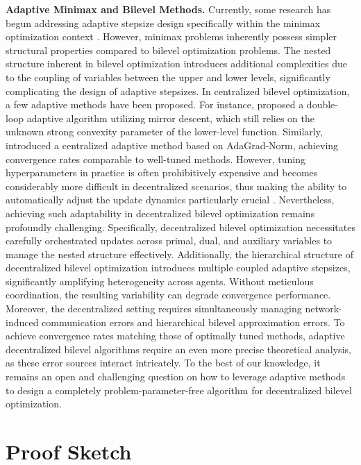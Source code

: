 \documentclass{article}
\theoremstyle{plain}
\theoremstyle{definition}
\theoremstyle{remark}
\begin{document}
\textbf{Adaptive Minimax and Bilevel Methods.}
Currently, some research has begun addressing adaptive stepsize design specifically within the minimax optimization context \citep{li2022tiada, huang2024adaptive, huang2024achieving}. However, minimax problems inherently possess simpler structural properties compared to bilevel optimization problems. The nested structure inherent in bilevel optimization introduces additional complexities due to the coupling of variables between the upper and lower levels, significantly complicating the design of adaptive stepsizes.
In centralized bilevel optimization, a few adaptive methods have been proposed. For instance, \citet{antonakopoulos2024adaptive} proposed a double-loop adaptive algorithm utilizing mirror descent, which still relies on the unknown strong convexity parameter of the lower-level function.
Similarly, \citet{yang2024tuning} introduced a centralized adaptive method based on AdaGrad-Norm, achieving convergence rates comparable to well-tuned methods. However, tuning hyperparameters in practice is often prohibitively expensive and becomes considerably more difficult in decentralized scenarios, thus making the ability to automatically adjust the update dynamics particularly crucial \citep{li2024problem}. Nevertheless, achieving such adaptability in decentralized bilevel optimization remains profoundly challenging. Specifically, decentralized bilevel optimization necessitates carefully orchestrated updates across primal, dual, and auxiliary variables to manage the nested structure effectively. Additionally, the hierarchical structure of decentralized bilevel optimization introduces multiple coupled adaptive stepsizes, significantly amplifying heterogeneity across agents. Without meticulous coordination, the resulting variability can degrade convergence performance. Moreover, the decentralized setting requires simultaneously managing network-induced communication errors and hierarchical bilevel approximation errors. To achieve convergence rates matching those of optimally tuned methods, adaptive decentralized bilevel algorithms require an even more precise theoretical analysis, as these error sources interact intricately.
To the best of our knowledge, it remains an open and challenging question on how to leverage adaptive methods to design a completely problem-parameter-free algorithm for decentralized bilevel optimization.

\section{Proof Sketch}\label{proof}
\end{document}
